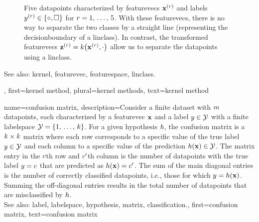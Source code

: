 {{\begin{figure}[H]
\begin{center}
			\end{center}
		\caption{Five \glspl{datapoint} characterized by \glspl{featurevec} ${\bf x}^{(r)}$ 
			and \glspl{label} $y^{(r)} \in \{ \circ, \square \}$ for $r=1, \,\ldots, \,5$. 
			With these \glspl{featurevec}, there is no way to separate the two classes 
			by a straight line (representing the \gls{decisionboundary} of a \gls{linclass}). 
			In contrast, the transformed \glspl{featurevec} ${\bf z}^{(r)} = k\big({\bf x}^{(r)},\cdot\big)$ 
			allow us to separate the \glspl{datapoint} using a \gls{linclass}.  \label{fig_linsep_kernel_dict}}
		\end{figure}
		See also: \gls{kernel}, \gls{featurevec}, \gls{featurespace}, \gls{linclass}.},
	first={kernel method},
	plural={kernel methods},
	text={kernel method} 
}
	
{name={confusion matrix}, 
	description={Consider a finite \gls{dataset} 
		with $m$ \glspl{datapoint}, each characterized 
		by a \gls{featurevec} ${\bf x}$ and a \gls{label} 
		$y \in \mathcal{Y}$ with a finite \gls{labelspace} $\mathcal{Y} = \{1, \,\ldots, \,k\}$. 
		For a given \gls{hypothesis} $h$, the confusion \gls{matrix} is a 
		$k \times k$ \gls{matrix} where each row corresponds 
		to a specific value of the true \gls{label} $y \in \mathcal{Y}$ 
		and each column to a specific value of the \gls{prediction} $h({\bf x}) \in \mathcal{Y}$. 
		The \gls{matrix} entry in the $c$th row and $c'$th 
		column is the number of \glspl{datapoint} with the true \gls{label} 
		$y = c$ that are predicted as 
		$h({\bf x}) = c'$. The sum of the main 
		diagonal entries is the number of correctly classified 
		\glspl{datapoint}, i.e., those for which $y = h({\bf x})$. 
		Summing the off-diagonal entries results in the total number of \glspl{datapoint} 
		that are misclassified by $h$.
				\\
		See also: \gls{label}, \gls{labelspace}, \gls{hypothesis}, \gls{matrix}, \gls{classification}.},
	first={confusion matrix},
	text={confusion matrix} 
}

